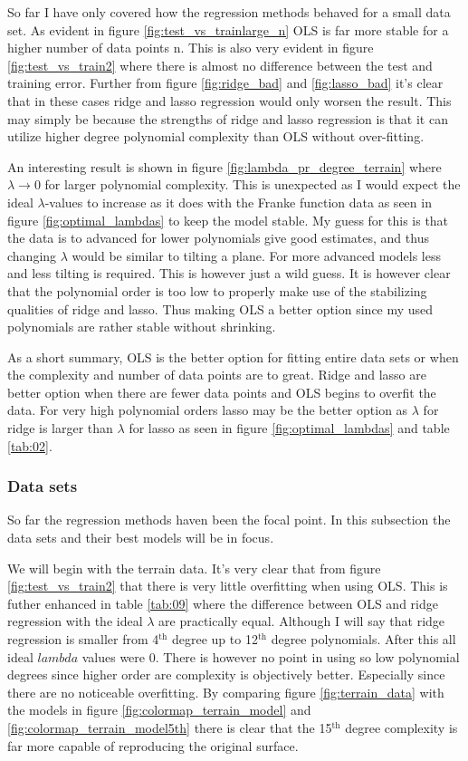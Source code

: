 \documentclass[uio,jmp,amsmath,amssymb,reprint,nofootinbib]{revtex4-1}
\numberwithin{equation}{section}
\begin{document}
So far I have only covered how the regression methods behaved for a small data set. As evident in figure \ref{fig:test_vs_trainlarge_n} OLS is far more stable for a higher number of data points n. This is also very evident in figure \ref{fig:test_vs_train2} where there is almost no difference between the test and training error. Further from figure \ref{fig:ridge_bad} and \ref{fig:lasso_bad} it's clear that in these cases ridge and lasso regression would only worsen the result. This may simply be because the strengths of ridge and lasso regression is that it can utilize higher degree polynomial complexity than OLS without over-fitting. 

An interesting result is shown in figure \ref{fig:lambda_pr_degree_terrain} where \(\lambda \rightarrow 0\) for larger polynomial complexity. This is unexpected as I would expect the ideal \(\lambda\)-values to increase as it does with the Franke function data as seen in figure \ref{fig:optimal_lambdas} to keep the model stable. My guess for this is that the data is to advanced for lower polynomials give good estimates, and thus changing \(\lambda\) would be similar to tilting a plane. For more advanced models less and less tilting is required. This is however just a wild guess. It is however clear that the polynomial order is too low to properly make use of the stabilizing qualities of ridge and lasso. Thus making OLS a better option since my used polynomials are rather stable without shrinking.

As a short summary, OLS is the better option for fitting entire data sets or when the complexity and number of data points are to great. Ridge and lasso are better option when there are fewer data points and OLS begins to overfit the data. For very high polynomial orders lasso may be the better option as \(\lambda\) for ridge is larger than \(\lambda\) for lasso as seen in figure \ref{fig:optimal_lambdas} and table \ref{tab:02}.

\subsubsection{Data sets}

So far the regression methods haven been the focal point. In this subsection the data sets and their best models will be in focus.

We will begin with the terrain data. It's very clear that from figure \ref{fig:test_vs_train2} that there is very little overfitting when using OLS. This is futher enhanced in table \ref{tab:09} where the difference between OLS and ridge regression with the ideal \(\lambda\) are practically equal. Although I will say that ridge regression is smaller from 4\(^\text{th}\) degree up to 12\(^\text{th}\) degree polynomials. After this all ideal \(lambda\) values were 0. There is however no point in using so low polynomial degrees since higher order are complexity is objectively better. Especially since there are no noticeable overfitting. By comparing figure \ref{fig:terrain_data} with the models in figure \ref{fig:colormap_terrain_model} and \ref{fig:colormap_terrain_model5th} there is clear that the 15\(^\text{th}\) degree complexity is far more capable of reproducing the original surface.
\end{document}
